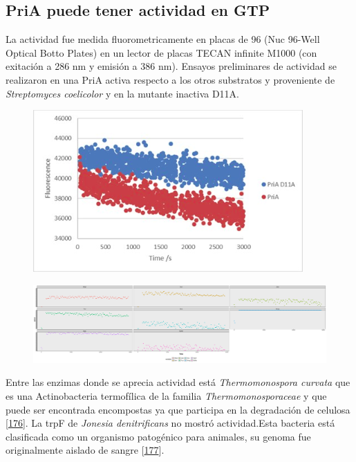 \documentclass[12pt,twoside]{reedthesis}
\begin{document}
  \subsection{PriA puede tener actividad en
  GTP}\label{pria-puede-tener-actividad-en-gtp}
  
  La actividad fue medida fluorometricamente en placas de 96 (Nuc 96-Well
  Optical Botto Plates) en un lector de placas TECAN infinite M1000 (con
  exitación a 286 nm y emisión a 386 nm). Ensayos preliminares de
  actividad se realizaron en una PriA activa respecto a los otros
  substratos y proveniente de \emph{Streptomyces coelicolor} y en la
  mutante inactiva D11A.
  
  \begin{figure}[h!tbp]
  \centering
  \includegraphics[angle = 0,scale = 0.8]{chapter4/MutantControl.png}
  \caption[Scoe and non functional Scoe PriA acting on dGTP]{\footnotesize{}}
  \label{fig:PriARutas1}
  \end{figure}
  
  \begin{figure}[h!tbp]
  \centering
  \includegraphics[angle = 0,scale = 0.6]{chapter4/GTPCinetica.pdf}
  \caption[Scoe and non functional Scoe PriA acting on dGTP]{\footnotesize{}}
  \label{fig:PriARutas2}
  \end{figure}
  
  \clearpage  
  
  Entre las enzimas donde se aprecia actividad está \emph{Thermomonospora
  curvata} que es una Actinobacteria termofílica de la familia
  \emph{Thermomonosporaceae} y que puede ser encontrada encompostas ya que
  participa en la degradación de celulosa
  {[}\protect\hyperlink{ref-chertkov_complete_2011}{176}{]}. La trpF de
  \emph{Jonesia denitrificans} no mostró actividad.Esta bacteria está
  clasificada como un organismo patogénico para animales, su genoma fue
  originalmente aislado de sangre
  {[}\protect\hyperlink{ref-pukall_complete_2009}{177}{]}.
  
\end{document}
